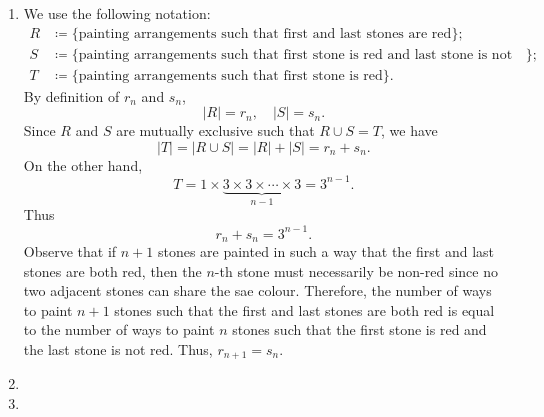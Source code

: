 \begin{enumerate}
\begin{solution}
\begin{enumerate}[label=(\alph*)]
\item We use the following notation:
\begin{align*}
R&\coloneqq\{\text{painting arrangements such that first and last stones are red}\};\\
S&\coloneqq\{\text{painting arrangements such that first stone is red and last stone is not red}\};\\
T&\coloneqq\{\text{painting arrangements such that first stone is red}\}.
\end{align*}
By definition of $r_n$ and $s_n$,
\[ |R|=r_n, \quad |S|=s_n. \]
Since $R$ and $S$ are mutually exclusive such that $R\cup S=T$, we have
\[ |T|=|R\cup S|=|R|+|S|=r_n+s_n. \]
On the other hand,
\[ T=1\times\underbrace{3\times3\times\cdots\times3}_{n-1}=3^{n-1}. \]
Thus \[ r_n+s_n=3^{n-1}. \]
Observe that if $n+1$ stones are painted in such a way that the first and last stones are both red, then the $n$-th stone must necessarily be non-red since no two adjacent stones can share the sae colour. Therefore, the number of ways to paint $n+1$ stones such that the first and last stones are both red is equal to the number of ways to paint $n$ stones such that the first stone is red and the last stone is not red. Thus, $r_{n+1}=s_n$.

\item 
\item 
\end{enumerate}
\end{solution}

\end{enumerate}

\pagebreak


